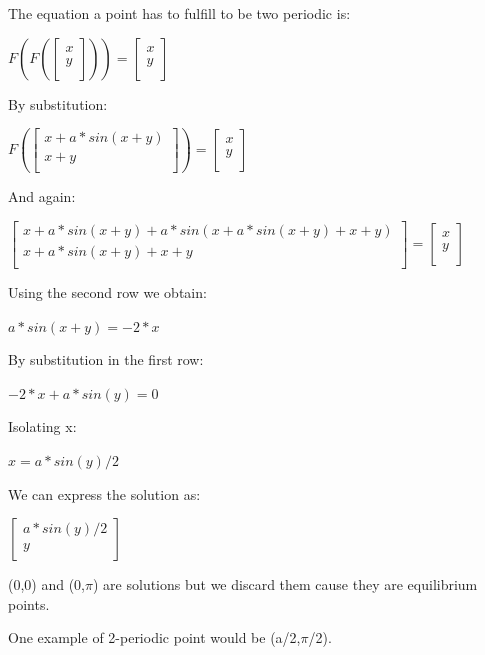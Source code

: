 \documentclass[]{scrartcl}
\begin{document}
The equation a point has to fulfill to be two periodic is:

$
F(F(
\begin{bmatrix}
	x \\
	y \\
\end{bmatrix})) =  \begin{bmatrix}
x \\
y \\
\end{bmatrix}
$

By substitution:

$
F(
\begin{bmatrix}
x + a * sin(x + y) \\
x + y \\
\end{bmatrix}) =  \begin{bmatrix}
x \\
y \\
\end{bmatrix}
$

And again:

$
\begin{bmatrix}
x + a * sin(x + y) + a * sin(x + a * sin(x + y) + x + y) \\
x + a * sin(x + y) + x + y \\
\end{bmatrix} =  \begin{bmatrix}
x \\
y \\
\end{bmatrix}
$

Using the second row we obtain:

$
a * sin(x + y) = - 2*x
$

By substitution in the first row:

$
- 2*x + a * sin(y) = 0
$

Isolating x:

$
x = a * sin(y)/2
$



We can express the solution as:

$
\begin{bmatrix}
a * sin(y)/2 \\
y \\
\end{bmatrix}
$

(0,0) and (0,$\pi$) are solutions but we discard them cause they are equilibrium points.

One example of 2-periodic point would be (a/2,$\pi$/2).
\end{document}
